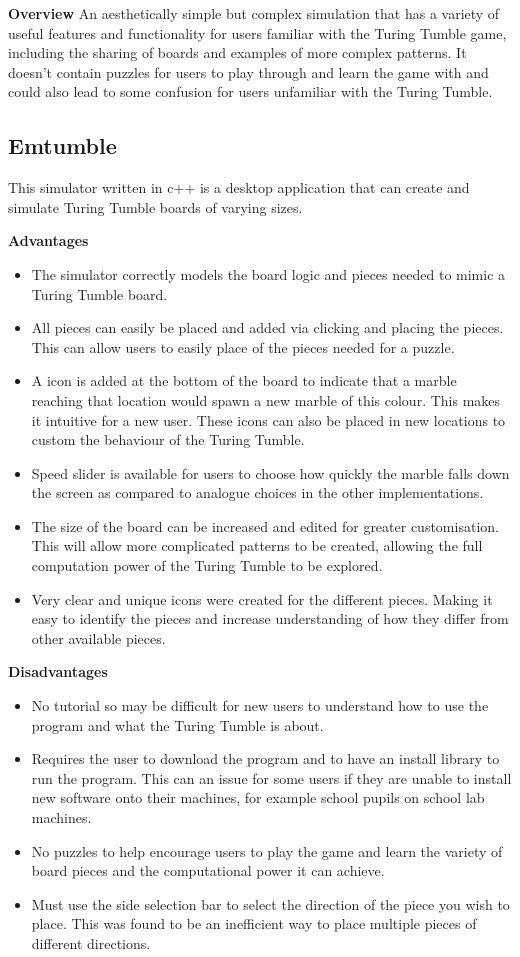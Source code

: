 \documentclass{l4proj}
\begin{document}
\textbf{Overview}
An aesthetically simple but complex simulation that has a variety of useful features and functionality for users familiar with the Turing Tumble game, including the sharing of boards and examples of more complex patterns. It doesn't contain puzzles for users to play through and learn the game with and could also lead to some confusion for users unfamiliar with the Turing Tumble.

\subsection{Emtumble}
This simulator written in c++ is a desktop application that can create and simulate Turing Tumble boards of varying sizes.

\textbf{Advantages}
\begin{itemize}
    \item The simulator correctly models the board logic and pieces needed to mimic a Turing Tumble board.
    \item All pieces can easily be placed and added via clicking and placing the pieces. This can allow users to easily place of the pieces needed for a puzzle.
    \item A icon is added at the bottom of the board to indicate that a marble reaching that location would spawn a new marble of this colour. This makes it intuitive for a new user. These icons can also be placed in new locations to custom the behaviour of the Turing Tumble.
    \item Speed slider is available for users to choose how quickly the marble falls down the screen as compared to analogue choices in the other implementations.
    \item The size of the board can be increased and edited for greater customisation. This will allow more complicated patterns to be created, allowing the full computation power of the Turing Tumble to be explored.
    \item Very clear and unique icons were created for the different pieces. Making it easy to identify the pieces and increase understanding of how they differ from other available pieces.
\end{itemize}

\textbf{Disadvantages}
\begin{itemize}
    \item No tutorial so may be difficult for new users to understand how to use the program and what the Turing Tumble is about.
    \item Requires the user to download the program and to have an install library to run the program. This can an issue for some users if they are unable to install new software onto their machines, for example school pupils on school lab machines.
    \item No puzzles to help encourage users to play the game and learn the variety of board pieces and the computational power it can achieve.
    \item Must use the side selection bar to select the direction of the piece you wish to place. This was found to be an inefficient way to place multiple pieces of different directions.
\end{itemize}
\end{document}
